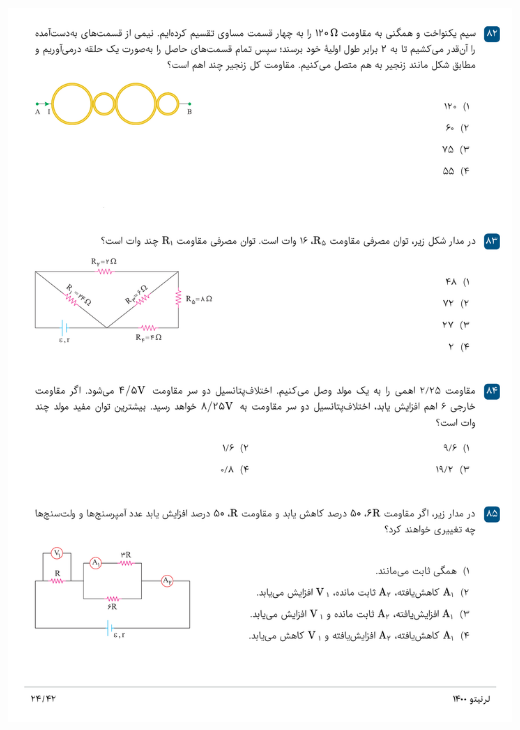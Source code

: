 \documentclass{book}
\begin{document}
\includegraphics[width=\textwidth]{"pages/24"}
\end{document}

